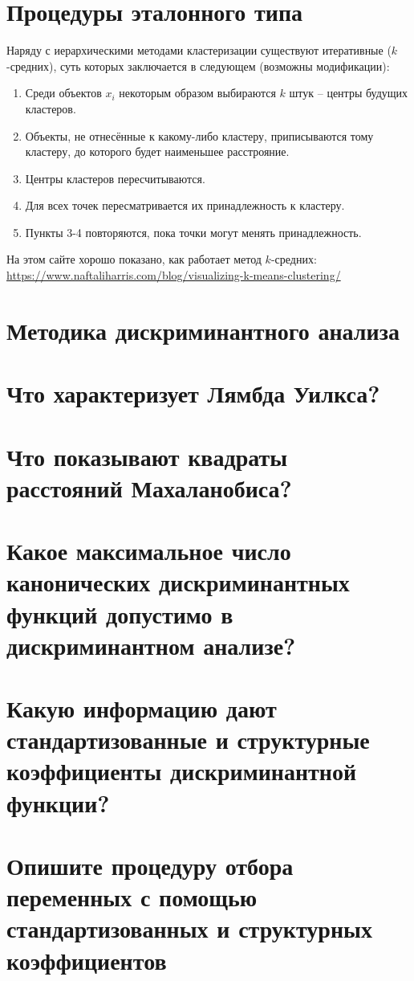 \documentclass[a4paper, 12pt]{article}
\begin{document}
\section{Процедуры эталонного типа}
Наряду с иерархическими методами кластеризации существуют итеративные ($k$-средних), суть которых заключается в следующем (возможны модификации):
\begin{enumerate}
    \item Среди объектов $x_i$ некоторым образом выбираются $k$ штук -- центры будущих кластеров.
    \item Объекты, не отнесённые к какому-либо кластеру, приписываются тому кластеру, до которого будет наименьшее расстрояние.
    \item Центры кластеров пересчитываются.
    \item Для всех точек пересматривается их принадлежность к кластеру.
    \item Пункты 3-4 повторяются, пока точки могут менять принадлежность.
\end{enumerate}
На этом сайте хорошо показано, как работает метод $k$-средних: \url{https://www.naftaliharris.com/blog/visualizing-k-means-clustering/}

\section{Методика дискриминантного анализа}
\section{Что характеризует Лямбда Уилкса?}
\section{Что показывают квадраты расстояний Махаланобиса?}
\section{Какое максимальное число канонических дискриминантных функций допустимо в дискриминантном анализе?}
\section{Какую информацию дают стандартизованные и структурные коэффициенты дискриминантной функции?}
\section{Опишите процедуру отбора переменных с помощью стандартизованных и структурных коэффициентов}
\end{document}
